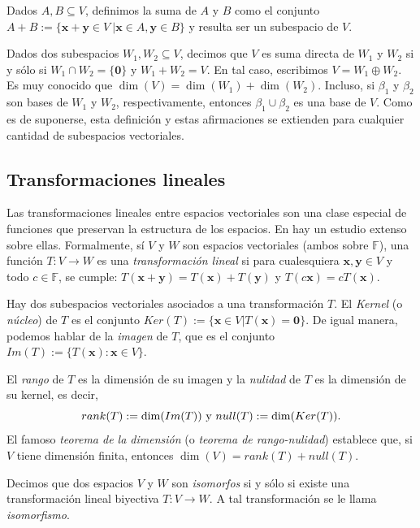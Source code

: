             Dados $A,B \subseteq V$, definimos la suma de $A$ y $B$ como el conjunto $A+B := \{ \mathbf{x + y} \in V\ | \mathbf{x}\in A, \mathbf{y} \in B \}$ y resulta ser un subespacio de $V$.

            Dados dos subespacios $W_{1},W_{2} \subseteq V$, decimos que $V$ es suma directa de $W_{1}$ y $W_{2}$ si y sólo si $W_{1} \cap W_{2} = \{\mathbf{0}\}$ y $W_{1} + W_{2} = V$. En tal caso, escribimos $V = W_{1} \oplus W_{2}$. Es muy conocido que $\dim(V) = \dim(W_{1}) + \dim(W_{2})$. Incluso, si $\beta_{1}$ y $\beta_{2}$ son bases de $W_{1}$ y $W_{2}$, respectivamente, entonces $\beta_{1} \cup \beta_{2}$  es una base de $V$. Como es de suponerse, esta definición y estas afirmaciones se extienden para cualquier cantidad de subespacios vectoriales. 
        \subsection{Transformaciones lineales}
            Las transformaciones lineales entre espacios vectoriales son una clase especial de funciones que preservan la estructura de los espacios. En \cite{Friedberg} hay un estudio extenso sobre ellas. Formalmente, sí $V$ y $W$ son espacios vectoriales (ambos  sobre $\mathbb{F}$), una función $T : V \rightarrow W$ es una \textit{transformación lineal} si para cualesquiera $\mathbf{x,y} \in V$ y todo $ c \in \mathbb{F}$, se cumple: $T(\mathbf{x + y}) = T(\mathbf{x}) + T(\mathbf{y})$ y $T(c\mathbf{x}) = cT(\mathbf{x})$.


            Hay dos subespacios vectoriales asociados a una transformación $T$. El \textit{Kernel} (o \textit{núcleo}) de $T$ es el conjunto $Ker(T):= \{ \mathbf{x} \in V | T(\mathbf{x}) = \mathbf{0}\}$. De igual manera, podemos hablar de la \textit{imagen} de $T$, que es el conjunto \\ $Im(T):= \{ T(\mathbf{x}) : \mathbf{x} \in V\}$.

            El \textit{rango} de $T$ es la dimensión de su imagen y la \textit{nulidad} de $T$ es la dimensión de su kernel, es decir,
                $$rank(T):= \dim(Im(T))\textnormal{ y } null(T):= \dim(Ker(T)).$$ 
            El famoso \textit{teorema de la dimensión} (o \textit{teorema de rango-nulidad}) establece que, si $V$ tiene dimensión finita, entonces $\dim(V)= rank(T) + null(T)$.

            Decimos que dos espacios $V$ y $W$ son \textit{isomorfos} si y sólo si existe una transformación lineal biyectiva $T \colon V \rightarrow W$. A tal transformación se le llama \textit{isomorfismo}.

